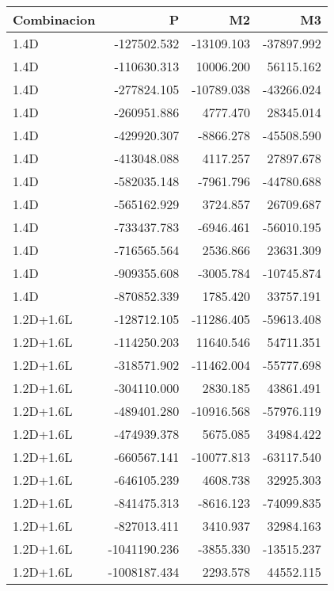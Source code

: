 \begin{tabular}{lrrr}
\toprule
Combinacion &            P &         M2 &         M3 \\
\midrule
       1.4D &  -127502.532 & -13109.103 & -37897.992 \\
       1.4D &  -110630.313 &  10006.200 &  56115.162 \\
       1.4D &  -277824.105 & -10789.038 & -43266.024 \\
       1.4D &  -260951.886 &   4777.470 &  28345.014 \\
       1.4D &  -429920.307 &  -8866.278 & -45508.590 \\
       1.4D &  -413048.088 &   4117.257 &  27897.678 \\
       1.4D &  -582035.148 &  -7961.796 & -44780.688 \\
       1.4D &  -565162.929 &   3724.857 &  26709.687 \\
       1.4D &  -733437.783 &  -6946.461 & -56010.195 \\
       1.4D &  -716565.564 &   2536.866 &  23631.309 \\
       1.4D &  -909355.608 &  -3005.784 & -10745.874 \\
       1.4D &  -870852.339 &   1785.420 &  33757.191 \\
  1.2D+1.6L &  -128712.105 & -11286.405 & -59613.408 \\
  1.2D+1.6L &  -114250.203 &  11640.546 &  54711.351 \\
  1.2D+1.6L &  -318571.902 & -11462.004 & -55777.698 \\
  1.2D+1.6L &  -304110.000 &   2830.185 &  43861.491 \\
  1.2D+1.6L &  -489401.280 & -10916.568 & -57976.119 \\
  1.2D+1.6L &  -474939.378 &   5675.085 &  34984.422 \\
  1.2D+1.6L &  -660567.141 & -10077.813 & -63117.540 \\
  1.2D+1.6L &  -646105.239 &   4608.738 &  32925.303 \\
  1.2D+1.6L &  -841475.313 &  -8616.123 & -74099.835 \\
  1.2D+1.6L &  -827013.411 &   3410.937 &  32984.163 \\
  1.2D+1.6L & -1041190.236 &  -3855.330 & -13515.237 \\
  1.2D+1.6L & -1008187.434 &   2293.578 &  44552.115 \\
\bottomrule
\end{tabular}
